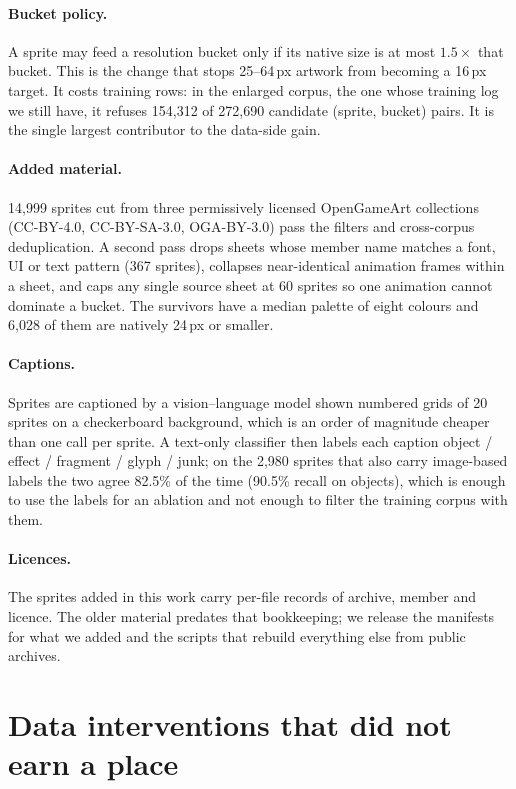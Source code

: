 \documentclass[10pt,twocolumn,letterpaper]{article}
\begin{document}
\paragraph{Bucket policy.}
A sprite may feed a resolution bucket only if its native size is at most $1.5\times$ that bucket. This is the change
that stops 25--64\,px artwork from becoming a 16\,px target. It costs training rows: in the enlarged corpus, the
one whose training log we still have, it refuses 154{,}312 of 272{,}690 candidate (sprite, bucket) pairs. It is the
single largest contributor to the data-side gain.

\paragraph{Added material.}
14{,}999 sprites cut from three permissively licensed OpenGameArt collections (CC-BY-4.0, CC-BY-SA-3.0, OGA-BY-3.0)
pass the filters and cross-corpus deduplication. A second pass drops sheets whose member name matches a font, UI or
text pattern (367 sprites), collapses near-identical animation frames within a sheet, and caps any single source sheet
at 60 sprites so one animation cannot dominate a bucket. The survivors have a median palette of eight colours and
6{,}028 of them are natively 24\,px or smaller.

\paragraph{Captions.}
Sprites are captioned by a vision--language model shown numbered grids of 20 sprites on a checkerboard background,
which is an order of magnitude cheaper than one call per sprite. A text-only classifier then labels each caption
object / effect / fragment / glyph / junk; on the 2{,}980 sprites that also carry image-based labels the two agree
82.5\% of the time (90.5\% recall on objects), which is enough to use the labels for an ablation and not enough to
filter the training corpus with them.

\paragraph{Licences.}
The sprites added in this work carry per-file records of archive, member and licence. The older material predates that
bookkeeping; we release the manifests for what we added and the scripts that rebuild everything else from public
archives.

\section{Data interventions that did not earn a place}
\label{sup:data-abl}
\end{document}
